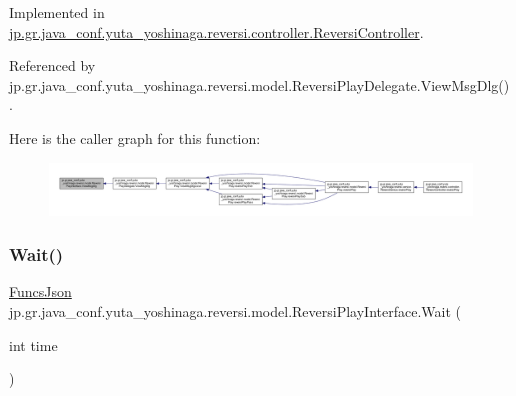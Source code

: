 Implemented in \hyperlink{classjp_1_1gr_1_1java__conf_1_1yuta__yoshinaga_1_1reversi_1_1controller_1_1_reversi_controller_ac3cff78c16b0190fd744317a8c1a07d6}{jp.\+gr.\+java\+\_\+conf.\+yuta\+\_\+yoshinaga.\+reversi.\+controller.\+Reversi\+Controller}.



Referenced by jp.\+gr.\+java\+\_\+conf.\+yuta\+\_\+yoshinaga.\+reversi.\+model.\+Reversi\+Play\+Delegate.\+View\+Msg\+Dlg().

Here is the caller graph for this function\+:
\nopagebreak
\begin{figure}[H]
\begin{center}
\leavevmode
\includegraphics[width=350pt]{interfacejp_1_1gr_1_1java__conf_1_1yuta__yoshinaga_1_1reversi_1_1model_1_1_reversi_play_interface_afb649f3782a7eb07b78a1b47031e48aa_icgraph}
\end{center}
\end{figure}
\mbox{\label{interfacejp_1_1gr_1_1java__conf_1_1yuta__yoshinaga_1_1reversi_1_1model_1_1_reversi_play_interface_ad89b0c606489a4a89d2778f7ad4c19dc}} 
\subsubsection{\texorpdfstring{Wait()}{Wait()}}
{\footnotesize\ttfamily \hyperlink{classjp_1_1gr_1_1java__conf_1_1yuta__yoshinaga_1_1reversi_1_1model_1_1_funcs_json}{Funcs\+Json} jp.\+gr.\+java\+\_\+conf.\+yuta\+\_\+yoshinaga.\+reversi.\+model.\+Reversi\+Play\+Interface.\+Wait (\begin{DoxyParamCaption}\item[{int}]{time }\end{DoxyParamCaption})}



